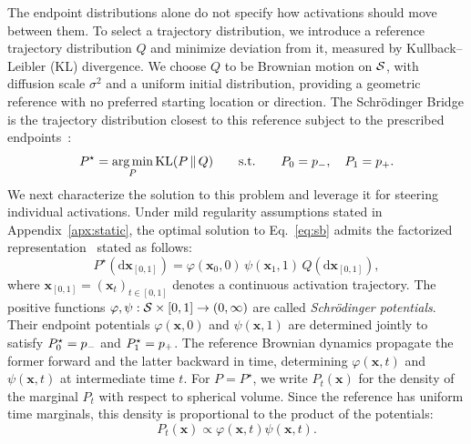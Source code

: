 The endpoint distributions alone do not specify how activations should move between them. To select a trajectory distribution, we introduce a reference trajectory distribution $Q$ and minimize deviation from it, measured by Kullback--Leibler (KL) divergence. We choose $Q$ to be Brownian motion on $\mathcal{S}$, with diffusion scale $\sigma^2$ and a uniform initial distribution, providing a geometric reference with no preferred starting location or direction. The Schr\"{o}dinger Bridge is the trajectory distribution closest to this reference subject to the prescribed endpoints~\citep{schrodinger1932theorie, de2021diffusion}:
\begin{equation}
P^\star=\operatorname*{arg\,min}_{P}\mathrm{KL}(P\,\Vert\,Q)
\qquad\text{s.t.}\qquad P_0=p_{-},\quad P_1=p_{+}.
\label{eq:sb}
\end{equation}
We next characterize the solution to this problem and leverage it for steering individual activations. Under mild regularity assumptions stated in Appendix~\ref{apx:static}, the optimal solution to Eq.~\eqref{eq:sb} admits the factorized representation~\citep{leonard2013survey} stated as follows:
\begin{equation}
P^\star(\mathrm{d}\boldsymbol{x}_{[0,1]})
=
\varphi(\boldsymbol{x}_0,0)\,
\psi(\boldsymbol{x}_1,1)\,
Q(\mathrm{d}\boldsymbol{x}_{[0,1]}),
\label{eq:sb-factorization}
\end{equation}
where $\boldsymbol{x}_{[0,1]}=(\boldsymbol{x}_t)_{t\in[0,1]}$ denotes a continuous activation trajectory. The positive functions $\varphi,\psi:\mathcal{S}\times[0,1]\to(0,\infty)$ are called \emph{Schr\"{o}dinger potentials}. Their endpoint potentials $\varphi(\boldsymbol{x},0)$ and $\psi(\boldsymbol{x},1)$ are determined jointly to satisfy $P^\star_0=p_{-}$ and $P^\star_1=p_{+}$. The reference Brownian dynamics propagate the former forward and the latter backward in time, determining $\varphi(\boldsymbol{x},t)$ and $\psi(\boldsymbol{x},t)$ at intermediate time $t$. For $P=P^\star$, we write $P_t(\boldsymbol{x})$ for the density of the marginal $P_t$ with respect to spherical volume. Since the reference has uniform time marginals, this density is proportional to the product of the potentials:
\begin{equation}
P_t(\boldsymbol{x})
\propto \varphi(\boldsymbol{x},t)\psi(\boldsymbol{x},t).
\label{eq:product}
\end{equation}

